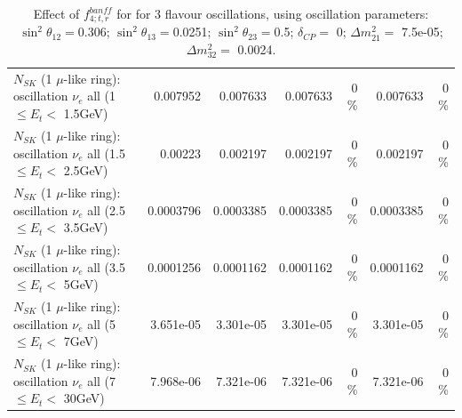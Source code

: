 \begin{table}
\begin{tabular}{| l | r | r | r  r | r  r |}
$N_{SK}$ (1 $\mu$-like ring): oscillation $\nu_{e}$ all (1 $\leq E_{t} <$ 1.5GeV) &        0.007952 &        0.007633 &        0.007633 &        0 \%  &        0.007633 &        0 \%  \\ 
$N_{SK}$ (1 $\mu$-like ring): oscillation $\nu_{e}$ all (1.5 $\leq E_{t} <$ 2.5GeV) &         0.00223 &        0.002197 &        0.002197 &        0 \%  &        0.002197 &        0 \%  \\ 
$N_{SK}$ (1 $\mu$-like ring): oscillation $\nu_{e}$ all (2.5 $\leq E_{t} <$ 3.5GeV) &       0.0003796 &       0.0003385 &       0.0003385 &        0 \%  &       0.0003385 &        0 \%  \\ 
$N_{SK}$ (1 $\mu$-like ring): oscillation $\nu_{e}$ all (3.5 $\leq E_{t} <$ 5GeV) &       0.0001256 &       0.0001162 &       0.0001162 &        0 \%  &       0.0001162 &        0 \%  \\ 
 $N_{SK}$ (1 $\mu$-like ring): oscillation $\nu_{e}$ all (5 $\leq E_{t} <$ 7GeV) &       3.651e-05 &       3.301e-05 &       3.301e-05 &        0 \%  &       3.301e-05 &        0 \%  \\ 
$N_{SK}$ (1 $\mu$-like ring): oscillation $\nu_{e}$ all (7 $\leq E_{t} <$ 30GeV) &       7.968e-06 &       7.321e-06 &       7.321e-06 &        0 \%  &       7.321e-06 &        0 \%  \\ 
\hline
\hline
\end{tabular}
\caption{ Effect of $f_{4; t, r}^{banff}$ for for 3 flavour oscillations, using oscillation parameters:  $\sin^2\theta_{12} = $0.306; $\sin^2\theta_{13} = $0.0251; $\sin^2\theta_{23} = $0.5; $\delta_{CP} = $        0; $\Delta m^2_{21} = $    7.5e-05; $\Delta m^2_{32} = $    0.0024. }
\label{tab:num_banff_04_1RmuT_3f_osc_t13:0.0251}
\end{table}
\clearpage
